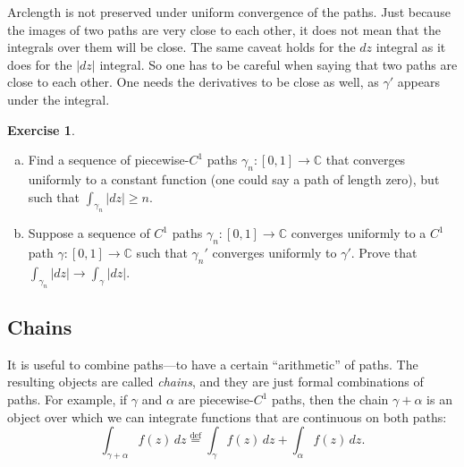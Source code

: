 \documentclass[12pt,openany]{book}
\newcommand{\sabs}[1]{\lvert {#1} \rvert}
\newcommand{\C}{{\mathbb{C}}}
\newcommand{\myquote}[1]{``#1''}
\theoremstyle{plain}
\theoremstyle{remark}
\theoremstyle{definition}
\newenvironment{exbox}{%
    \def\FrameCommand{\vrule width 1pt \relax\hspace{10pt}}%
    \MakeFramed{\advance\hsize-\width\FrameRestore}%
}{%
    \endMakeFramed
}
\newenvironment{exparts}{%
    \leavevmode\begin{enumerate}[a),noitemsep,topsep=0pt,parsep=0pt,partopsep=0pt]
}{%
    \end{enumerate}
}
\theoremstyle{exercise}
\newtheorem{exercise}{Exercise}[section]
\theoremstyle{example}
\begin{document}
Arclength is not preserved under uniform convergence of the paths.
Just because the images of two paths are very close to each
other, it does not mean that the integrals over them will be close.
The same caveat holds for the $dz$ integral as it does for the $\sabs{dz}$
integral.
So one has to be careful when saying that two paths are close to each other.
One needs the derivatives to be close as well, as $\gamma'$ appears
under the integral.

\begin{exbox}
\begin{exercise}
\begin{exparts}
\item
Find a sequence of piecewise-$C^1$ paths $\gamma_n \colon [0,1] \to \C$
that converges uniformly to a constant function (one could say a path of
length zero), but such that $\int_{\gamma_n} \sabs{dz} \geq n$.
\item
Suppose a sequence of $C^1$ paths $\gamma_n \colon [0,1] \to \C$
converges uniformly to a $C^1$ path $\gamma \colon [0,1] \to \C$
such that $\gamma_n'$ converges uniformly to $\gamma'$.
Prove that
$\int_{\gamma_n} \sabs{dz} \to
\int_{\gamma} \sabs{dz}$.
\end{exparts}
\end{exercise}
\end{exbox}

\subsection{Chains}

It is useful to combine paths---to have a certain \myquote{arithmetic} of paths.
The resulting objects are called \emph{chains}, and they
are just formal combinations of paths.  For example, if $\gamma$
and $\alpha$ are piecewise-$C^1$ paths, then the chain  $\gamma+\alpha$
is an object over which we can integrate functions that are continuous
on both paths:
\begin{equation*}
\int_{\gamma + \alpha} f(z) \, dz
\overset{\text{def}}{=}
\int_{\gamma} f(z) \, dz +
\int_{\alpha} f(z) \, dz .
\end{equation*}
\end{document}
